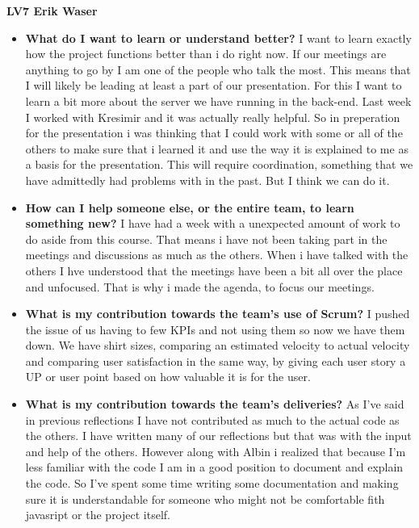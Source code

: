 \documentclass[]{article}
\begin{document}
\textbf{\huge{LV7} Erik Waser}

\begin{itemize}
    \item \textbf{What do I want to learn or understand better?} \newline
    I want to learn exactly how the project functions better than i do right now. If our meetings are anything to go by I am one of the people who talk the most. This means that I will likely be leading at least a part of our presentation. For this I want to learn a bit more about the server we have running in the back-end. Last week I worked with Kresimir and it was actually really helpful. So in preperation for the presentation i was thinking that I could work with some or all of the others to make sure that i learned it and use the way it is explained to me as a basis for the presentation. This will require coordination, something that we have admittedly had problems with in the past. But I think we can do it.
    
    \item \textbf{How can I help someone else, or the entire team, to learn something new?} \newline
    I have had a week with a unexpected amount of work to do aside from this course. That means i have not been taking part in the meetings and discussions as much as the others. When i have talked with the others I hve understood that the meetings have been a bit all over the place and unfocused. That is why i made the agenda, to focus our meetings. 
    
    
    \item \textbf{What is my contribution towards the team’s use of Scrum?} \newline
    I pushed the issue of us having to few KPIs and not using them so now we have them down. We have shirt sizes, comparing an estimated velocity to actual velocity and comparing user satisfaction in the same way, by giving each user story a UP or user point based on how valuable it is for the user. 
    
    \item \textbf{What is my contribution towards the team’s deliveries?} \newline
    As I've said in previous reflections I have not contributed as much to the actual code as the others. I have written many of our reflections but that was with the input and help of the others. However along with Albin i realized that because I'm less familiar with the code I am in a good position to document and explain the code. So I've spent some time writing some documentation and making sure it is understandable for someone who might not be comfortable fith javasript or the project itself. 
    
\end{itemize}
\end{document}
